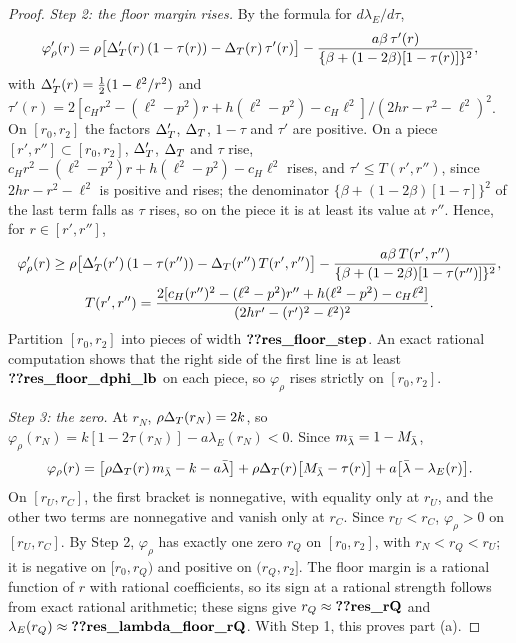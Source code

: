 \begin{proof}
\emph{Step 2: the floor margin rises.} By the formula for \(d\lambda_E/d\tau\),
\[
\varphi_\rho'(r)=\rho\bigl[\Delta_T'(r)\,(1-\tau(r))-\Delta_T(r)\,\tau'(r)\bigr]
-\frac{a\beta\,\tau'(r)}{\{\beta+(1-2\beta)[1-\tau(r)]\}^2},
\]
with \(\Delta_T'(r)=\tfrac12(1-\ell^2/r^2)\) and \(\tau'(r)=2[c_Hr^2-(\ell^2-p^2)r+h(\ell^2-p^2)-c_H\ell^2]/(2hr-r^2-\ell^2)^2\). On \([r_0,r_2]\) the factors
\(\Delta_T'\), \(\Delta_T\), \(1-\tau\) and \(\tau'\) are positive. On a piece \([r',r'']\subset[r_0,r_2]\), \(\Delta_T'\), \(\Delta_T\)
and \(\tau\) rise, \(c_Hr^2-(\ell^2-p^2)r+h(\ell^2-p^2)-c_H\ell^2\) rises, and \(\tau'\le T(r',r'')\), since \(2hr-r^2-\ell^2\) is positive and rises; the
denominator \(\{\beta+(1-2\beta)[1-\tau]\}^2\) of the last term falls as \(\tau\) rises, so on the piece it is at
least its value at \(r''\). Hence, for \(r\in[r',r'']\),
\begin{gather*}
\varphi_\rho'(r)\ge\rho\bigl[\Delta_T'(r')\,(1-\tau(r''))-\Delta_T(r'')\,T(r',r'')\bigr]
-\frac{a\beta\,T(r',r'')}{\{\beta+(1-2\beta)[1-\tau(r'')]\}^2},\\
T(r',r'')=\frac{2[c_H(r'')^2-(\ell^2-p^2)r''+h(\ell^2-p^2)-c_H\ell^2]}{(2hr'-(r')^2-\ell^2)^2}.
\end{gather*}
Partition \([r_0,r_2]\) into pieces of width \(\reg{res_floor_step}\). An exact rational computation shows that the
right side of the first line is at least \(\reg{res_floor_dphi_lb}\) on each piece, so \(\varphi_\rho\) rises
strictly on \([r_0,r_2]\).

\emph{Step 3: the zero.} At \(r_N\), \(\rho\Delta_T(r_N)=2k\), so \(\varphi_\rho(r_N)=k[1-2\tau(r_N)]-a\lambda_E(r_N)<0\).
Since \(m_{\bar\lambda}=1-M_{\bar\lambda}\),
\[
\varphi_\rho(r)=\bigl[\rho\Delta_T(r)\,m_{\bar\lambda}-k-a\bar\lambda\bigr]+\rho\Delta_T(r)\bigl[M_{\bar\lambda}-\tau(r)\bigr]+a\bigl[\bar\lambda-\lambda_E(r)\bigr].
\]
On \([r_U,r_C]\), the first bracket is nonnegative, with equality only at \(r_U\), and the other two terms are
nonnegative and vanish only at \(r_C\). Since \(r_U<r_C\), \(\varphi_\rho>0\) on \([r_U,r_C]\). By Step 2,
\(\varphi_\rho\) has exactly one zero \(r_Q\) on \([r_0,r_2]\), with \(r_N<r_Q<r_U\); it is negative on \([r_0,r_Q)\)
and positive on \((r_Q,r_2]\). The floor margin is a rational function of \(r\) with rational coefficients, so its
sign at a rational strength follows from exact rational arithmetic; these signs give \(r_Q\approx\reg{res_rQ}\) and
\(\lambda_E(r_Q)\approx\reg{res_lambda_floor_rQ}\). With Step 1, this proves part (a).


\end{proof}
